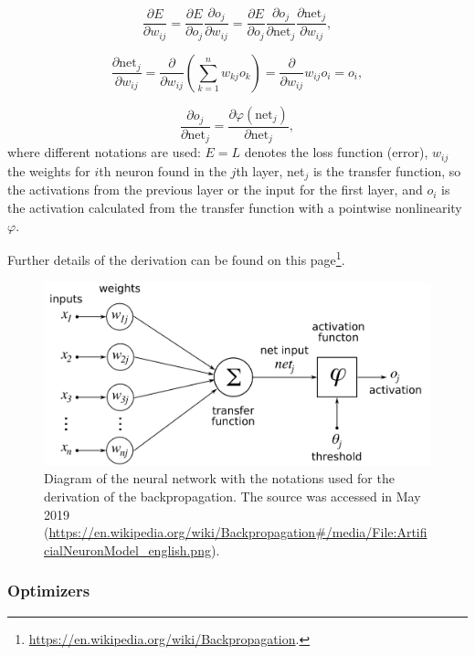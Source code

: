 \documentclass[12pt]{article}
\theoremstyle{plain}
\begin{document}
\begin{equation}
\frac{\partial E}{\partial w_{ij}} = \frac{\partial E}{\partial o_{j}} \frac{\partial o_{j}}{\partial w_{ij}}
= \frac{\partial E}{\partial o_j} \frac{\partial o_j}{\partial\text{net}_j} \frac{\partial \text{net}_j}{\partial w_{ij}},
\end{equation}


\begin{equation}
\frac{\partial \text{net}_j}{\partial w_{ij}} = \frac{\partial}{\partial w_{ij}} \left(\sum_{k=1}^n w_{kj} o_k\right) = \frac{\partial}{\partial w_{ij}}  w_{ij} o_i= o_i,
\end{equation}

\begin{equation}
\frac{\partial o_j}{\partial\text{net}_j} = \frac {\partial  \varphi(\text{net}_j)}{\partial \text{net}_j},
\end{equation}
where different notations are used: $E=L$ denotes the loss function (error), $w_{ij}$ the weights for $i$th neuron found in the $j$th layer, net$_j$ is the transfer function, so the activations from the previous layer or the input for the first layer, and $o_i$ is the activation calculated from the transfer function with a pointwise nonlinearity $\varphi$. 

Further details of the derivation can be found on this page\footnote{\url{https://en.wikipedia.org/wiki/Backpropagation}.}.

\begin{figure}[h!]
    \centering
	\includegraphics[width=.9\linewidth]{media/ArtificialNeuronModel_english.png}
	\caption{Diagram of the neural network with the notations used for the derivation of the backpropagation. The source was accessed in May 2019 (\url{https://en.wikipedia.org/wiki/Backpropagation\#/media/File:ArtificialNeuronModel_english.png}).}
	\label{backprop_fig}
\end{figure}

\subsubsection{Optimizers}
\end{document}
